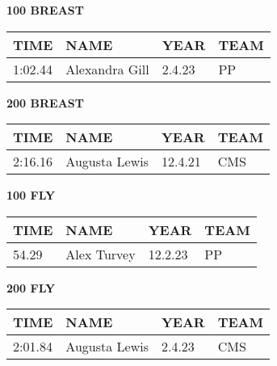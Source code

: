 \begin{minipage}[t]{0.48\textwidth}
\centering
\textbf{100 BREAST}\\[0.05cm]
\begin{tabular}{@{}p{1.8cm}p{2.8cm}p{1.2cm}p{1.4cm}@{}}
\hline
\textbf{TIME} & \textbf{NAME} & \textbf{YEAR} & \textbf{TEAM} \\
\hline
1:02.44 & Alexandra Gill & 2.4.23 & PP \\
\hline
\end{tabular}
\end{minipage}\hfill
\begin{minipage}[t]{0.48\textwidth}
\centering
\textbf{200 BREAST}\\[0.05cm]
\begin{tabular}{@{}p{1.8cm}p{2.8cm}p{1.2cm}p{1.4cm}@{}}
\hline
\textbf{TIME} & \textbf{NAME} & \textbf{YEAR} & \textbf{TEAM} \\
\hline
2:16.16 & Augusta Lewis & 12.4.21 & CMS \\
\hline
\end{tabular}
\end{minipage}

\vspace{0.4cm}

\begin{minipage}[t]{0.48\textwidth}
\centering
\textbf{100 FLY}\\[0.05cm]
\begin{tabular}{@{}p{1.8cm}p{2.8cm}p{1.2cm}p{1.4cm}@{}}
\hline
\textbf{TIME} & \textbf{NAME} & \textbf{YEAR} & \textbf{TEAM} \\
\hline
54.29 & Alex Turvey & 12.2.23 & PP \\
\hline
\end{tabular}
\end{minipage}\hfill
\begin{minipage}[t]{0.48\textwidth}
\centering
\textbf{200 FLY}\\[0.05cm]
\begin{tabular}{@{}p{1.8cm}p{2.8cm}p{1.2cm}p{1.4cm}@{}}
\hline
\textbf{TIME} & \textbf{NAME} & \textbf{YEAR} & \textbf{TEAM} \\
\hline
2:01.84 & Augusta Lewis & 2.4.23 & CMS \\
\hline
\end{tabular}
\end{minipage}

\vspace{0.4cm}

